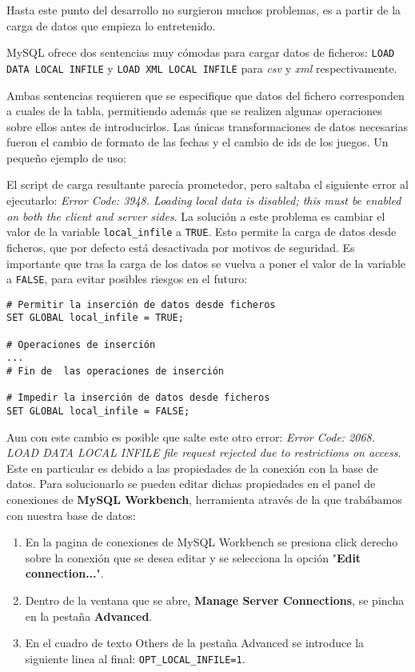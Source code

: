 \documentclass[a4paper, 11pt, oneside]{article} %
\begin{document}
Hasta este punto del desarrollo no surgieron muchos problemas, es a partir de la carga de datos que empieza lo entretenido.

MySQL ofrece dos sentencias muy cómodas para cargar datos de ficheros: \texttt{LOAD DATA LOCAL INFILE} y \texttt{LOAD XML LOCAL INFILE} para \emph{csv} y \emph{xml} respectivamente.

Ambas sentencias requieren que se especifique que datos del fichero corresponden a cuales de la tabla, permitiendo además que se realizen algunas operaciones sobre ellos antes de introducirlos. Las únicas transformaciones de datos necesarias fueron el cambio de formato de las fechas y el cambio de ids de los juegos. Un pequeño ejemplo de uso:

El script de carga resultante parecía prometedor, pero saltaba el siguiente error al ejecutarlo: \emph{Error Code: 3948. Loading local data is disabled; this must be enabled on both the client and server sides}. La solución a este problema es cambiar el valor de la variable \texttt{local_infile} a \texttt{TRUE}. Esto permite la carga de datos desde ficheros, que por defecto está desactivada por motivos de seguridad. Es importante que tras la carga de los datos se vuelva a poner el valor de la variable a \texttt{FALSE}, para evitar posibles riesgos en el futuro:

\begin{verbatim}
# Permitir la inserción de datos desde ficheros
SET GLOBAL local_infile = TRUE;

# Operaciones de inserción
...
# Fin de  las operaciones de inserción

# Impedir la inserción de datos desde ficheros
SET GLOBAL local_infile = FALSE;
\end{verbatim}

Aun con este cambio es posible que salte este otro error: \emph{Error Code: 2068. LOAD DATA LOCAL INFILE file request rejected due to restrictions on access}. Este en particular es debido a las propiedades de la conexión con la base de datos. Para solucionarlo se pueden editar dichas propiedades en el panel de conexiones de \textbf{MySQL Workbench}, herramienta através de la que trabábamos con nuestra base de datos:

\begin{enumerate}
	\item En la pagina de conexiones de MySQL Workbench se presiona click derecho sobre la conexión que se desea editar y se selecciona la opción "\textbf{Edit connection...}".
	\item Dentro de la ventana que se abre, \textbf{Manage Server Connections}, se pincha en la pestaña \textbf{Advanced}.
	\item En el cuadro de texto Others de la pestaña Advanced se introduce la siguiente linea al final: \texttt{OPT_LOCAL_INFILE=1}.
\end{enumerate}
\end{document}
